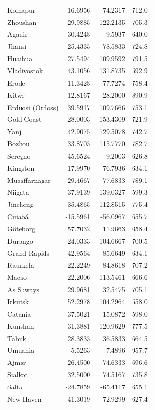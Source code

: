 \begin{longtable}{lrrc}
Kolhapur & 16.6956 & 74.2317 & 712.0 \\
Zhoushan & 29.9885 & 122.2135 & 705.3 \\
Agadir & 30.4248 & -9.5937 & 640.0 \\
Jhansi & 25.4333 & 78.5833 & 724.8 \\
Huaihua & 27.5494 & 109.9592 & 791.5 \\
Vladivostok & 43.1056 & 131.8735 & 592.9 \\
Erode & 11.3428 & 77.7274 & 758.4 \\
Kitwe & -12.8167 & 28.2000 & 890.9 \\
Erduosi (Ordoss) & 39.5917 & 109.7666 & 753.1 \\
Gold Coast & -28.0003 & 153.4309 & 721.9 \\
Yanji & 42.9075 & 129.5078 & 742.7 \\
Bozhou & 33.8703 & 115.7770 & 782.7 \\
Seregno & 45.6524 & 9.2003 & 626.8 \\
Kingston & 17.9970 & -76.7936 & 634.1 \\
Muzaffarnagar & 29.4667 & 77.6833 & 789.1 \\
Niigata & 37.9139 & 139.0327 & 599.3 \\
Jincheng & 35.4865 & 112.8515 & 775.4 \\
Cuiabá & -15.5961 & -56.0967 & 655.7 \\
Göteborg & 57.7032 & 11.9663 & 658.4 \\
Durango & 24.0333 & -104.6667 & 700.5 \\
Grand Rapids & 42.9564 & -85.6649 & 634.1 \\
Raurkela & 22.2249 & 84.8618 & 707.2 \\
Macao & 22.2006 & 113.5461 & 666.6 \\
As Suways & 29.9681 & 32.5475 & 705.1 \\
Irkutsk & 52.2978 & 104.2964 & 558.0 \\
Catania & 37.5021 & 15.0872 & 598.0 \\
Kunshan  & 31.3881 & 120.9629 & 777.5 \\
Tabuk & 28.3833 & 36.5833 & 664.5 \\
Umuahia & 5.5263 & 7.4896 & 957.7 \\
Ajmer & 26.4500 & 74.6333 & 696.6 \\
Sialkot & 32.5000 & 74.5167 & 735.8 \\
Salta & -24.7859 & -65.4117 & 655.1 \\
New Haven & 41.3019 & -72.9299 & 627.4 \\

\end{longtable}
